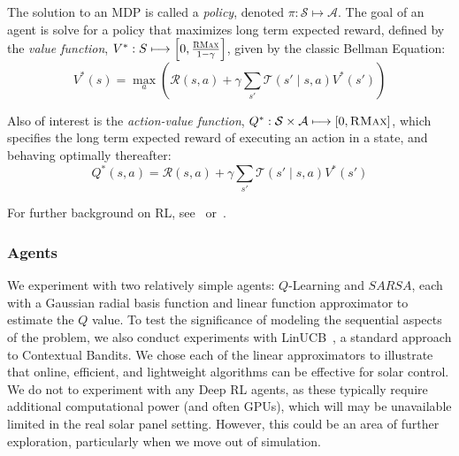 \documentclass{article}
\newcommand{\mc}{\mathcal}
\begin{document}
{The solution to an MDP is called a {\it policy}, denoted $\pi : \mc{S} \longmapsto \mc{A}$. The goal of an agent is solve for a policy that maximizes long term expected reward, defined by the {\it value function}, $V^* : S \longmapsto \left[0,\frac{\textsc{RMax}}{1-\gamma}\right]$, given by the classic Bellman Equation:
\begin{equation}
V^*(s) = \max_a \left(\mc{R}(s,a) + \gamma \sum_{s'} \mc{T}(s' \mid s, a) V^*(s') \right)
\end{equation}

Also of interest is the {\it action-value function}, $Q^*: \mc{S} \times \mc{A} \longmapsto [0,\textsc{RMax}]$, which specifies the long term expected reward of executing an action in a state, and behaving optimally thereafter:
\begin{equation}
Q^*(s,a) = \mc{R}(s,a) + \gamma \sum_{s'} \mc{T}(s' \mid s,a) V^*(s')
\end{equation}


For further background on RL, see~\citet{sutton1998reinforcement} or~\citet{kaelbling1996reinforcement}.

\subsubsection{Agents}

We experiment with two relatively simple agents: $Q$-Learning and $SARSA$, each with a Gaussian radial basis function and linear function approximator to estimate the $Q$ value. To test the significance of modeling the sequential aspects of the problem, we also conduct experiments with LinUCB~\cite{li2010contextual}, a standard approach to Contextual Bandits. We chose each of the linear approximators to illustrate that online, efficient, and lightweight algorithms can be effective for solar control. We do not to experiment with any Deep RL agents, as these typically require additional computational power (and often GPUs), which will may be unavailable limited in the real solar panel setting. However, this could be an area of further exploration, particularly when we move out of simulation.

}
\end{document}
